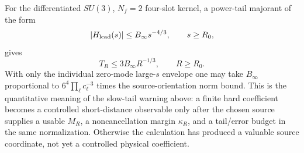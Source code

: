 \begin{controlledapproximation}
For the differentiated \(SU(3)\), \(N_f=2\) four-slot kernel, a power-tail
majorant of the form
\[
  |H_{\rm lead}(s)|
  \le
  B_\infty s^{-4/3},
  \qquad s\ge R_0,
\]
gives
\begin{equation}
  T_R
  \le
  3B_\infty R^{-1/3},
  \qquad R\ge R_0 .
  \label{eq:hard-instanton-window-tail-bound}
\end{equation}
With only the individual zero-mode large-\(s\) envelope one may take
\(B_\infty\) proportional to
\(6^4\prod_\ell c_\ell^{-3}\) times the source-orientation norm bound.  This
is the quantitative meaning of the slow-tail warning above: a finite hard
coefficient becomes a controlled short-distance observable only after the
chosen source supplies a usable \(M_R\), a noncancellation margin
\(\kappa_R\), and a tail/error budget in the same normalization.  Otherwise
the calculation has produced a valuable source coordinate, not yet a
controlled physical coefficient.
\end{controlledapproximation}

